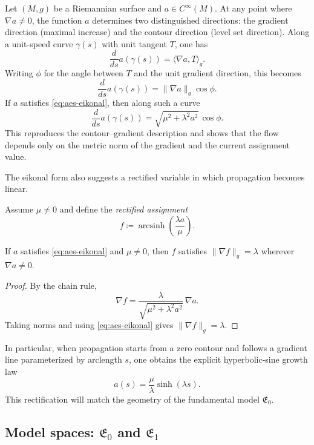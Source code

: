 Let $(M,g)$ be a Riemannian surface and $a\in C^{\infty}(M)$. At any point where $\nabla a\neq 0$, the function $a$ determines two distinguished directions: the gradient direction (maximal increase) and the contour direction (level set direction). Along a unit-speed curve $\gamma(s)$ with unit tangent $T$, one has
\[
\frac{d}{ds}a(\gamma(s))=\langle \nabla a, T\rangle_g.
\]
Writing $\phi$ for the angle between $T$ and the unit gradient direction, this becomes
\[
\frac{d}{ds}a(\gamma(s))=\|\nabla a\|_g\cos\phi.
\]
If $a$ satisfies \eqref{eq:aes-eikonal}, then along such a curve
\[
\frac{d}{ds}a(\gamma(s))=\sqrt{\mu^2+\lambda^2 a^2}\,\cos\phi.
\]
This reproduces the contour--gradient description and shows that the flow depends only on the metric norm of the gradient and the current assignment value.

The eikonal form also suggests a rectified variable in which propagation becomes linear.

\begin{definition}\label{def:aes-rectification}
Assume $\mu\neq 0$ and define the \emph{rectified assignment}
\[
f \coloneqq \operatorname{arcsinh}\!\left(\frac{\lambda a}{\mu}\right).
\]
\end{definition}

\begin{lemma}\label{lemma:aes-rectified-gradient}
If $a$ satisfies \eqref{eq:aes-eikonal} and $\mu\neq 0$, then $f$ satisfies $\|\nabla f\|_g=\lambda$ wherever $\nabla a\neq 0$.
\end{lemma}

\begin{proof}
By the chain rule,
\[
\nabla f=\frac{\lambda}{\sqrt{\mu^2+\lambda^2 a^2}}\,\nabla a.
\]
Taking norms and using \eqref{eq:aes-eikonal} gives $\|\nabla f\|_g=\lambda$.
\end{proof}

In particular, when propagation starts from a zero contour and follows a gradient line parameterized by arclength $s$, one obtains the explicit hyperbolic-sine growth law
\begin{equation}\label{eq:aes-hyperbolic-sine}
a(s)=\frac{\mu}{\lambda}\sinh(\lambda s).
\end{equation}
This rectification will match the geometry of the fundamental model $\mathfrak{E}_0$.

\subsection{Model spaces: \texorpdfstring{$\mathfrak{E}_0$}{E0} and \texorpdfstring{$\mathfrak{E}_1$}{E1}}\label{subsec:aes-models}

